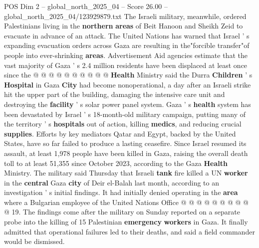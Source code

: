 \begin{textsample}{POS Dim 2 – global\_north\_2025\_04 – Score 26.00 – global\_north\_2025\_04/123929879.txt}
The Israeli military, meanwhile, ordered Palestinians living in the \textbf{northern} \textbf{areas} of Beit Hanoon and Sheikh Zeid to evacuate in advance of an attack.
The United Nations has warned that Israel ' s expanding evacuation orders across Gaza are resulting in the"forcible transfer"of people into ever-shrinking \textbf{areas}.
Advertisement Aid agencies estimate that the vast majority of Gaza ' s 2.4 million residents have been displaced at least once since the @ @ @ @ @ @ @ @ @ @ \textbf{Health} Ministry said the Durra \textbf{Children} ' s \textbf{Hospital} in Gaza \textbf{City} had become nonoperational, a day after an Israeli strike hit the upper part of the building, damaging the intensive care unit and destroying the \textbf{facility} ' s solar power panel system.
Gaza ' s \textbf{health} system has been devastated by Israel ' s 18-month-old military campaign, putting many of the territory ' s \textbf{hospitals} out of action, killing \textbf{medics}, and reducing crucial \textbf{supplies}.
Efforts by key mediators Qatar and Egypt, backed by the United States, have so far failed to produce a lasting ceasefire.
Since Israel resumed its assault, at least 1,978 people have been killed in Gaza, raising the overall death toll to at least 51,355 since October 2023, according to the Gaza \textbf{Health} Ministry.
The military said Thursday that Israeli \textbf{tank} fire killed a UN \textbf{worker} in the \textbf{central} Gaza \textbf{city} of Deir el-Balah last month, according to an investigation ' s initial findings.
It had initially denied operating in the \textbf{area} where a Bulgarian employee of the United Nations Office @ @ @ @ @ @ @ @ @ @ 19.
The findings come after the military on Sunday reported on a separate probe into the killing of 15 Palestinian \textbf{emergency} \textbf{workers} in Gaza.
It finally admitted that operational failures led to their deaths, and said a field commander would be dismissed.

\end{textsample}
